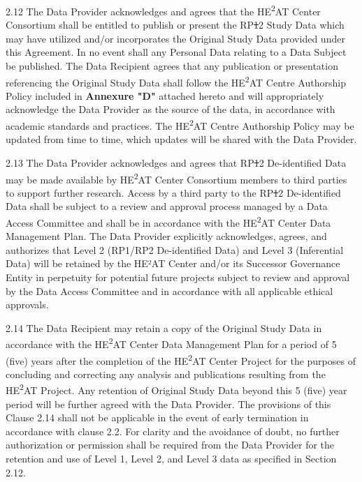 \documentclass[12pt,letterpaper]{article}
\newcommand{\deleted}[1]{\textcolor{deletecolor}{\sout{#1}}}
\newcommand{\added}[1]{\textcolor{addcolor}{#1}}
\begin{document}
2.12 The Data Provider acknowledges and agrees that the HE\textsuperscript{2}AT Center Consortium shall be entitled to publish or present the RP\deleted{1}\added{2} Study Data which may have utilized and/or incorporates the Original Study Data provided under this Agreement. In no event shall any Personal Data relating to a Data Subject be published. The Data Recipient agrees that any publication or presentation referencing the Original Study Data shall follow the HE\textsuperscript{2}AT Centre Authorship Policy included in \textbf{Annexure "D"} attached hereto and will appropriately acknowledge the Data Provider as the source of the data, in accordance with academic standards and practices. The HE\textsuperscript{2}AT Centre Authorship Policy may be updated from time to time, which updates will be shared with the Data Provider.

2.13 The Data Provider acknowledges and agrees that RP\deleted{1}\added{2} De-identified Data may be made available by HE\textsuperscript{2}AT Center Consortium members to third parties to support further research. Access by a third party to the RP\deleted{1}\added{2} De-identified Data shall be subject to a review and approval process managed by a Data Access Committee and shall be in accordance with the HE\textsuperscript{2}AT Center Data Management Plan. \added{The Data Provider explicitly acknowledges, agrees, and authorizes that Level 2 (RP1/RP2 De-identified Data) and Level 3 (Inferential Data) will be retained by the HE²AT Center and/or its Successor Governance Entity in perpetuity for potential future projects subject to review and approval by the Data Access Committee and in accordance with all applicable ethical approvals.}

2.14 The Data Recipient may retain a copy of the Original Study Data in accordance with the HE\textsuperscript{2}AT Center Data Management Plan for a period of 5 (five) years after the completion of the HE\textsuperscript{2}AT Center Project for the purposes of concluding and correcting any analysis and publications resulting from the HE\textsuperscript{2}AT Project. Any retention of Original Study Data beyond this 5 (five) year period will be further agreed with the Data Provider. The provisions of this Clause 2.14 shall not be applicable in the event of early termination in accordance with clause 2.2. \added{For clarity and the avoidance of doubt, no further authorization or permission shall be required from the Data Provider for the retention and use of Level 1, Level 2, and Level 3 data as specified in Section 2.12.}
\end{document}

